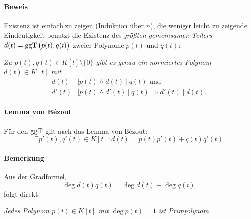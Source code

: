 \paragraph{Beweis}	
	Existenz ist einfach zu zeigen (Induktion über $ n $), die weniger leicht zu zeigende Eindeutigkeit benutzt die Existenz des \emph{größten gemeinsamen Teilers} $ d(t) = \operatorname{ggT}\big(p(t),q(t)\big) $ zweier Polynome $ p(t) $ und $ q(t) $:

	\begin{addmargin}{1cm}
		\textit{Zu $ p(t),q(t) \in K[t]\setminus \{0\} $ gibt es genau ein normiertes Polynom $ d(t)\in K[t] $ mit
			\begin{align*}
				d(t)&\mid p(t)\land d(t)\mid q(t) \text{ und}\\
				d'(t)&\mid p(t)\land d'(t)\mid q(t) \Rightarrow d'(t)\mid d(t).
			\end{align*}}
	\end{addmargin}
\paragraph{Lemma von B\'ezout}
	\label{Bezout}
	\begin{Lemma}
	Für den $ \operatorname{ggT} $ gilt auch das Lemma von B\'ezout:
		\[ \exists p'(t),q'(t)\in K[t]: d(t)=p(t)p'(t)+q(t)q'(t) \]
	\end{Lemma}
\paragraph{Bemerkung}
	Aus der Gradformel,
		\[ \deg d(t)q(t) = \deg d(t)+\deg q(t) \]
	folgt direkt:
		\begin{addmargin}{1cm}
			\textit{Jedes Polynom $ p(t)\in K[t] $ mit $ \deg p(t)=1 $ ist Primpolynom.}
		\end{addmargin}

